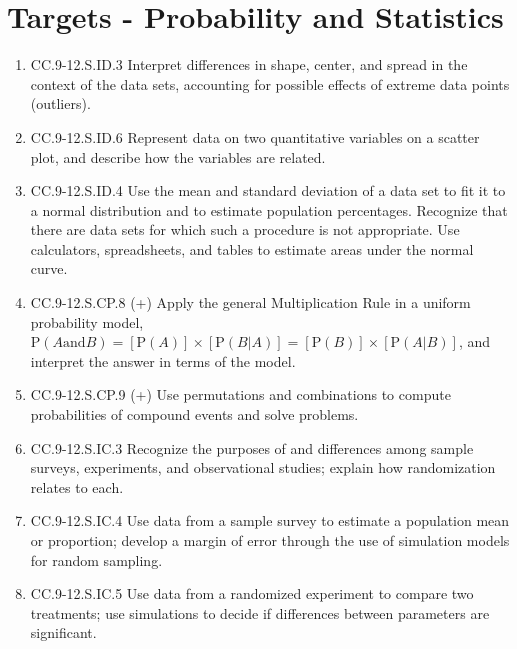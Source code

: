 \documentclass{article}
\begin{document}
\section*{Targets - Probability and Statistics}
\begin{enumerate}

	\item CC.9-12.S.ID.3 Interpret differences in shape, center, and spread in the context of the data sets, accounting for possible effects of extreme data points (outliers).

	\item CC.9-12.S.ID.6  Represent data on two quantitative variables on a scatter plot, and describe how the variables are related.
	\item CC.9-12.S.ID.4  Use the mean and standard deviation of a data set to fit it to a normal distribution and to estimate population percentages. Recognize that there are data sets for which such a procedure is not appropriate. Use calculators, spreadsheets, and tables to estimate areas under the normal curve.
	\item CC.9-12.S.CP.8 (+)  Apply the general Multiplication Rule in a uniform probability model, $\textrm{P}(A \textrm{and} B) = [\textrm{P}(A)]\times[\textrm{P}(B|A)] =[\textrm{P}(B)]\times[\textrm{P}(A|B)]$, and interpret the answer in terms of the model.
	\item CC.9-12.S.CP.9 (+) Use permutations and combinations to compute probabilities of compound events and solve problems.


	\item CC.9-12.S.IC.3  Recognize the purposes of and differences among sample surveys, experiments, and observational studies; explain how randomization relates to each.
	\item CC.9-12.S.IC.4  Use data from a sample survey to estimate a population mean or proportion; develop a margin of error through the use of simulation models for random sampling.
	\item CC.9-12.S.IC.5  Use data from a randomized experiment to compare two treatments; use simulations to decide if differences between parameters are significant.



\end{enumerate}
\end{document}
